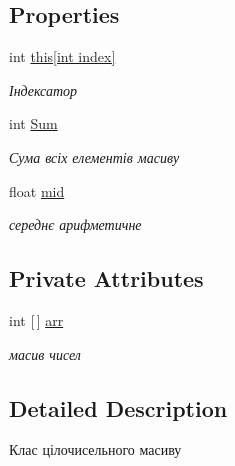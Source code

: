 \subsection*{Properties}
\begin{DoxyCompactItemize}
\item 
int \hyperlink{class_c_sharp_lab2_1_1_int_array_a42f8a711f5fbeba620b137326bbc241d}{this\mbox{[}int index\mbox{]}}
\begin{DoxyCompactList}\small\item\em Індексатор \end{DoxyCompactList}\item 
int \hyperlink{class_c_sharp_lab2_1_1_int_array_a8a753df2be5385be3b9dcf8cdf70d7fb}{Sum}
\begin{DoxyCompactList}\small\item\em Сума всіх елементів масиву \end{DoxyCompactList}\item 
float \hyperlink{class_c_sharp_lab2_1_1_int_array_abb9c31974804db308f3628d1d98ece91}{mid}
\begin{DoxyCompactList}\small\item\em середнє арифметичне \end{DoxyCompactList}\end{DoxyCompactItemize}
\subsection*{Private Attributes}
\begin{DoxyCompactItemize}
\item 
int \mbox{[}$\,$\mbox{]} \hyperlink{class_c_sharp_lab2_1_1_int_array_adfe65a25352fc485dfd771e03c9b9362}{arr}
\begin{DoxyCompactList}\small\item\em масив чисел \end{DoxyCompactList}\end{DoxyCompactItemize}


\subsection{Detailed Description}
Клас цілочисельного масиву 



